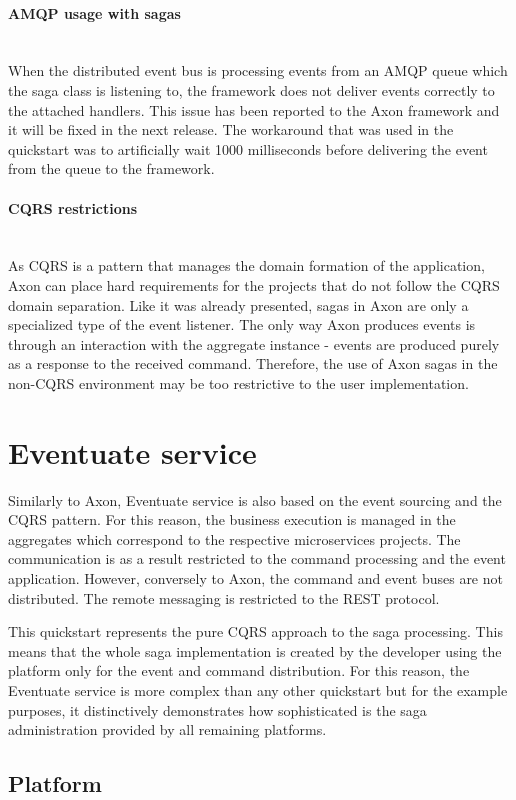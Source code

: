 \documentclass[oneside,
  digital, %
  table,   %
  lof,     %
  lot,     %
]{fithesis3}
\newcommand{\newlinepar}[1]{\paragraph{#1}\needspace{3\baselineskip}\mbox{}\\}
\begin{document}
\newlinepar{AMQP usage with sagas}

When the distributed event bus is processing events from an AMQP queue which the saga class is listening to, the framework does not deliver events correctly to the attached handlers. This issue has been reported to the Axon framework and it will be fixed in the next release. The workaround that was used in the quickstart was to artificially wait 1000 milliseconds before delivering the event from the queue to the framework.

\newlinepar{CQRS restrictions}

As CQRS is a pattern that manages the domain formation of the application, Axon can place hard requirements for the projects that do not follow the CQRS domain separation. Like it was already presented, sagas in Axon are only a specialized type of the event listener. The only way Axon produces events is through an interaction with the aggregate instance - events are produced purely as a response to the received command. Therefore, the use of Axon sagas in the non-CQRS environment may be too restrictive to the user implementation.


\section{Eventuate service}

Similarly to Axon, Eventuate service is also based on the event sourcing and the CQRS pattern. For this reason, the business execution is managed in the aggregates which correspond to the respective microservices projects. The communication is as a result restricted to the command processing and the event application. However, conversely to Axon, the command and event buses are not distributed. The remote messaging is restricted to the REST protocol.

This quickstart represents the pure CQRS approach to the saga processing. This means that the whole saga implementation is created by the developer using the platform only for the event and command distribution. For this reason, the Eventuate service is more complex than any other quickstart but for the example purposes, it distinctively demonstrates how sophisticated is the saga administration provided by all remaining platforms.

\subsection{Platform}
\label{sec:eventuate-platform}
\end{document}
